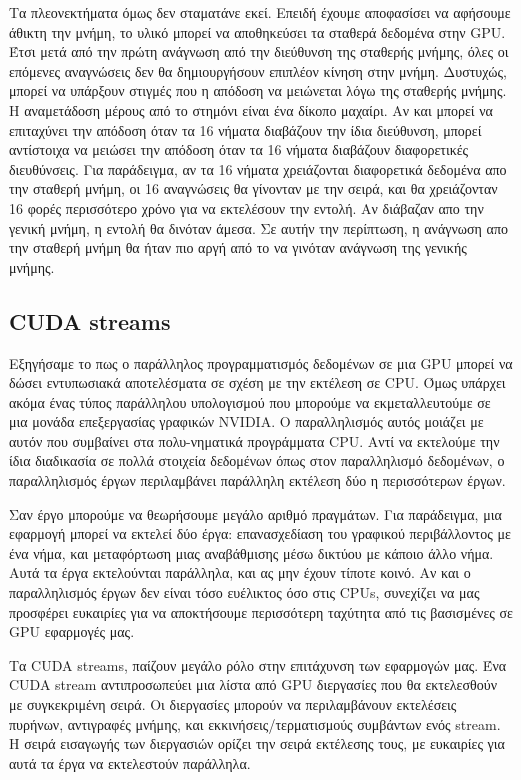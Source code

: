 Τα πλεονεκτήματα όμως δεν σταματάνε εκεί. Επειδή έχουμε αποφασίσει να αφήσουμε άθικτη την μνήμη, το υλικό μπορεί να αποθηκεύσει τα σταθερά δεδομένα στην GPU. Έτσι μετά από την πρώτη ανάγνωση από την διεύθυνση της σταθερής μνήμης, όλες οι επόμενες αναγνώσεις δεν θα δημιουργήσουν επιπλέον κίνηση στην μνήμη. Δυστυχώς, μπορεί να υπάρξουν στιγμές που η απόδοση να μειώνεται λόγω της σταθερής μνήμης. Η αναμετάδοση μέρους από το στημόνι είναι ένα δίκοπο μαχαίρι. Αν και μπορεί να επιταχύνει την απόδοση όταν τα 16 νήματα διαβάζουν την ίδια διεύθυνση, μπορεί αντίστοιχα να μειώσει την απόδοση όταν τα 16 νήματα διαβάζουν διαφορετικές διευθύνσεις. Για παράδειγμα, αν τα 16 νήματα χρειάζονται διαφορετικά δεδομένα απο την σταθερή μνήμη, οι 16 αναγνώσεις θα γίνονταν με την σειρά, και θα χρειάζονταν 16 φορές περισσότερο χρόνο για να εκτελέσουν την εντολή. Αν διάβαζαν απο την γενική μνήμη, η εντολή θα δινόταν άμεσα. Σε αυτήν την περίπτωση, η ανάγνωση απο την σταθερή μνήμη θα ήταν πιο αργή από το να γινόταν ανάγνωση της γενικής μνήμης.


\subsection{CUDA streams}
Εξηγήσαμε το πως ο παράλληλος προγραμματισμός δεδομένων σε μια GPU μπορεί να δώσει εντυπωσιακά αποτελέσματα σε σχέση με την εκτέλεση σε CPU. Όμως υπάρχει ακόμα ένας τύπος παράλληλου υπολογισμού που μπορούμε να εκμεταλλευτούμε σε μια μονάδα επεξεργασίας γραφικών NVIDIA. Ο παραλληλισμός αυτός μοιάζει με αυτόν που συμβαίνει στα πολυ-νηματικά προγράμματα CPU. Αντί να εκτελούμε την ίδια διαδικασία σε πολλά στοιχεία δεδομένων όπως στον παραλληλισμό δεδομένων, ο παραλληλισμός έργων περιλαμβάνει παράλληλη εκτέλεση δύο η περισσότερων έργων. 

Σαν έργο μπορούμε να θεωρήσουμε μεγάλο αριθμό πραγμάτων. Για παράδειγμα, μια εφαρμογή μπορεί να εκτελεί δύο έργα: επανασχεδίαση του γραφικού περιβάλλοντος με ένα νήμα, και μεταφόρτωση μιας αναβάθμισης μέσω δικτύου με κάποιο άλλο νήμα. Αυτά τα έργα εκτελούνται παράλληλα, και ας μην έχουν τίποτε κοινό. Αν και ο παραλληλισμός έργων δεν είναι τόσο ευέλικτος όσο στις CPUs, συνεχίζει να μας προσφέρει ευκαιρίες για να αποκτήσουμε περισσότερη ταχύτητα από τις βασισμένες σε GPU εφαρμογές μας.

Τα CUDA streams, παίζουν μεγάλο ρόλο στην επιτάχυνση των εφαρμογών μας. Ένα CUDA stream αντιπροσωπεύει μια λίστα από GPU διεργασίες που θα εκτελεσθούν με συγκεκριμένη σειρά. Οι διεργασίες μπορούν να περιλαμβάνουν εκτελέσεις πυρήνων, αντιγραφές μνήμης, και εκκινήσεις/τερματισμούς συμβάντων ενός stream. H σειρά εισαγωγής των διεργασιών ορίζει την σειρά εκτέλεσης τους, με ευκαιρίες για αυτά τα έργα να εκτελεστούν παράλληλα.

